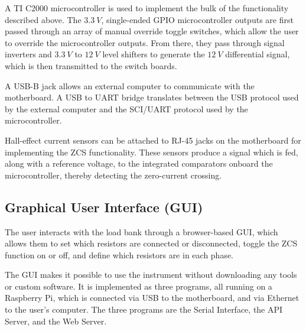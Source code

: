 \documentclass{article}
\begin{document}
A TI C2000 microcontroller is used to implement the bulk of the functionality described above. The $3.3\:V$, single-ended GPIO microcontroller outputs are first passed through an array of manual override toggle switches, which allow the user to override the microcontroller outputs. From there, they pass through signal inverters and $3.3\:V$ to $12\:V$ level shifters to generate the $12\:V$ differential signal, which is then transmitted to the switch boards.

A USB-B jack allows an external computer to communicate with the motherboard. A USB to UART bridge translates between the USB protocol used by the external computer and the SCI/UART protocol used by the microcontroller.

Hall-effect current sensors can be attached to RJ-45 jacks on the motherboard for implementing the ZCS functionality. These sensors produce a signal which is fed, along with a reference voltage, to the integrated comparators onboard the microcontroller, thereby detecting the zero-current crossing.

\vspace{0.2cm}
\subsection{Graphical User Interface (GUI)}
\label{subsec:gui}

The user interacts with the load bank through a browser-based GUI, which allows them to set which resistors are connected or disconnected, toggle the ZCS function on or off, and define which resistors are in each phase.

The GUI makes it possible to use the instrument without downloading any tools or custom software. It is implemented as three programs, all running on a Raspberry Pi, which is connected via USB to the motherboard, and via Ethernet to the user's computer. The three programs are the Serial Interface, the API Server, and the Web Server.
\end{document}
